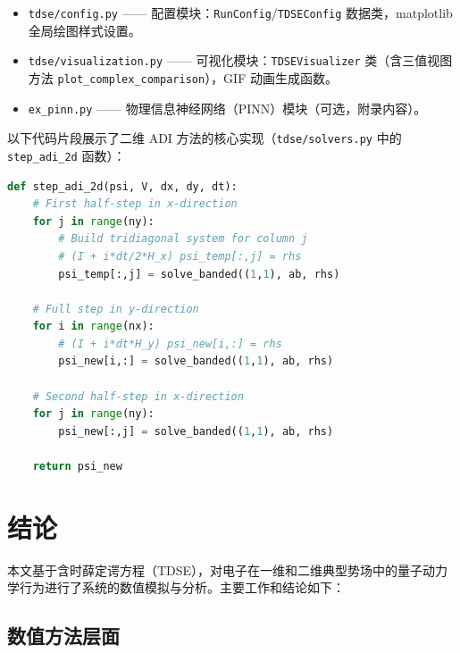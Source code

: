 \documentclass[12pt,a4paper]{article}
\begin{document}
\begin{itemize}
    \item \texttt{tdse/config.py} —— 配置模块：\texttt{RunConfig}/\texttt{TDSEConfig} 数据类，matplotlib 全局绘图样式设置。

    \item \texttt{tdse/visualization.py} —— 可视化模块：\texttt{TDSEVisualizer} 类（含三值视图方法 \texttt{plot\_complex\_comparison}），GIF 动画生成函数。

    \item \texttt{ex\_pinn.py} —— 物理信息神经网络（PINN）模块（可选，附录内容）。
\end{itemize}

以下代码片段展示了二维 ADI 方法的核心实现（\texttt{tdse/solvers.py} 中的 \texttt{step\_adi\_2d} 函数）：

\begin{lstlisting}[language=Python, caption={二维 ADI 方法核心实现（课本第~4章 CN 格式的二维推广）}, label={lst:adi}]
def step_adi_2d(psi, V, dx, dy, dt):
    # First half-step in x-direction
    for j in range(ny):
        # Build tridiagonal system for column j
        # (I + i*dt/2*H_x) psi_temp[:,j] = rhs
        psi_temp[:,j] = solve_banded((1,1), ab, rhs)

    # Full step in y-direction
    for i in range(nx):
        # (I + i*dt*H_y) psi_new[i,:] = rhs
        psi_new[i,:] = solve_banded((1,1), ab, rhs)

    # Second half-step in x-direction
    for j in range(ny):
        psi_new[:,j] = solve_banded((1,1), ab, rhs)

    return psi_new
\end{lstlisting}

\section{结论}

本文基于含时薛定谔方程（TDSE），对电子在一维和二维典型势场中的量子动力学行为进行了系统的数值模拟与分析。主要工作和结论如下：

\subsection{数值方法层面}
\end{document}
